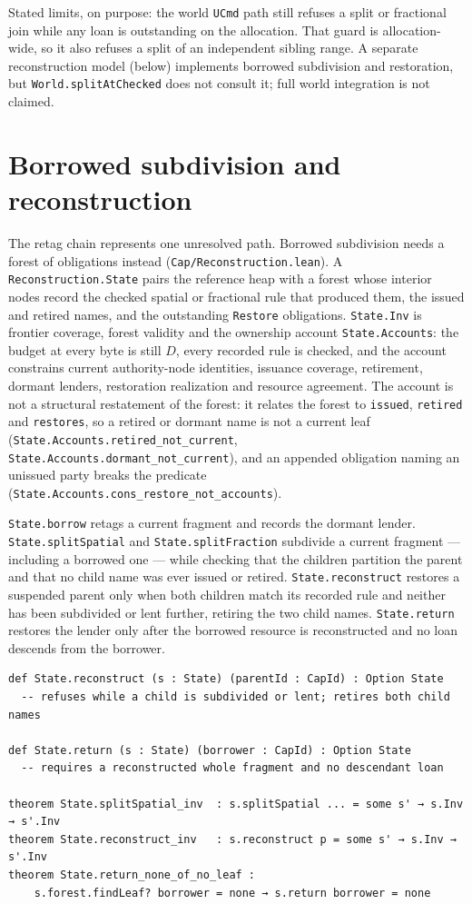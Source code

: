 \documentclass[10pt,a4paper]{article}
\newcommand{\file}[1]{\texttt{#1}}
\newcommand{\lean}[1]{\texttt{#1}}
\begin{document}
Stated limits, on purpose: the world \lean{UCmd} path still refuses a split or
fractional join while any loan is outstanding on the allocation. That guard is
allocation-wide, so it also refuses a split of an independent sibling range. A
separate reconstruction model (below) implements borrowed subdivision and
restoration, but \lean{World.splitAtChecked} does not consult it; full world
integration is not claimed.

\section{Borrowed subdivision and reconstruction}

The retag chain represents one unresolved path. Borrowed subdivision needs a
forest of obligations instead (\file{Cap/Reconstruction.lean}). A
\lean{Reconstruction.State} pairs the reference heap with a forest whose
interior nodes record the checked spatial or fractional rule that produced them,
the issued and retired names, and the outstanding \lean{Restore} obligations.
\lean{State.Inv} is frontier coverage, forest validity and the ownership account
\lean{State.Accounts}: the budget at every byte is still $D$, every recorded rule
is checked, and the account constrains current authority-node identities,
issuance coverage, retirement, dormant lenders, restoration realization and
resource agreement. The account is not a structural restatement of the forest: it
relates the forest to \lean{issued}, \lean{retired} and \lean{restores}, so a
retired or dormant name is not a current leaf
(\lean{State.Accounts.retired\_not\_current},
\lean{State.Accounts.dormant\_not\_current}), and an appended obligation naming an
unissued party breaks the predicate
(\lean{State.Accounts.cons\_restore\_not\_accounts}).

\lean{State.borrow} retags a current fragment and records the dormant lender.
\lean{State.splitSpatial} and \lean{State.splitFraction} subdivide a current
fragment --- including a borrowed one --- while checking that the children
partition the parent and that no child name was ever issued or retired.
\lean{State.reconstruct} restores a suspended parent only when both children
match its recorded rule and neither has been subdivided or lent further,
retiring the two child names. \lean{State.return} restores the lender only after
the borrowed resource is reconstructed and no loan descends from the borrower.

\begin{lstlisting}
def State.reconstruct (s : State) (parentId : CapId) : Option State
  -- refuses while a child is subdivided or lent; retires both child names

def State.return (s : State) (borrower : CapId) : Option State
  -- requires a reconstructed whole fragment and no descendant loan

theorem State.splitSpatial_inv  : s.splitSpatial ... = some s' → s.Inv → s'.Inv
theorem State.reconstruct_inv   : s.reconstruct p = some s' → s.Inv → s'.Inv
theorem State.return_none_of_no_leaf :
    s.forest.findLeaf? borrower = none → s.return borrower = none
\end{lstlisting}
\end{document}
